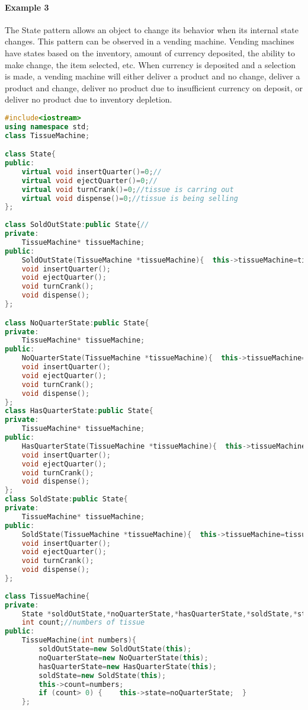 \documentclass{book}
\begin{document}
\paragraph{Example 3}\mbox{}
The State pattern allows an object to change its behavior when its internal state changes.
This pattern can be observed in a vending machine.
Vending machines have states based on the inventory, amount of currency deposited, the ability to make change, the item selected, etc.
When currency is deposited and a selection is made, a vending machine will either deliver a product and no change,
deliver a product and change, deliver no product due to insufficient currency on deposit, or deliver no product due to inventory depletion. 
\begin{lstlisting}[caption={State Pattern exmaple 3: vending (tissue only) meachine}, language=C++]
#include<iostream>  
using namespace std;  
class TissueMachine;

class State{  
public:  
    virtual void insertQuarter()=0;//  
    virtual void ejectQuarter()=0;//
    virtual void turnCrank()=0;//tissue is carring out
    virtual void dispense()=0;//tissue is being selling  
};  
  
class SoldOutState:public State{//  
private:  
    TissueMachine* tissueMachine;  
public:  
    SoldOutState(TissueMachine *tissueMachine){  this->tissueMachine=tissueMachine;  }  
    void insertQuarter();  
    void ejectQuarter();  
    void turnCrank();  
    void dispense();  
};  

class NoQuarterState:public State{
private:  
    TissueMachine* tissueMachine;  
public:  
    NoQuarterState(TissueMachine *tissueMachine){  this->tissueMachine=tissueMachine;  }  
    void insertQuarter();  
    void ejectQuarter();  
    void turnCrank();  
    void dispense();  
};  
class HasQuarterState:public State{
private:  
    TissueMachine* tissueMachine;  
public:  
    HasQuarterState(TissueMachine *tissueMachine){  this->tissueMachine=tissueMachine;  }  
    void insertQuarter();  
    void ejectQuarter();  
    void turnCrank();  
    void dispense();  
};  
class SoldState:public State{
private:  
    TissueMachine* tissueMachine;  
public:  
    SoldState(TissueMachine *tissueMachine){  this->tissueMachine=tissueMachine;  }  
    void insertQuarter();  
    void ejectQuarter();  
    void turnCrank();  
    void dispense();  
};  
  
class TissueMachine{  
private:  
    State *soldOutState,*noQuarterState,*hasQuarterState,*soldState,*state;  
    int count;//numbers of tissue  
public:  
    TissueMachine(int numbers){
        soldOutState=new SoldOutState(this);  
        noQuarterState=new NoQuarterState(this);  
        hasQuarterState=new HasQuarterState(this);  
        soldState=new SoldState(this);  
        this->count=numbers;  
        if (count> 0) {    this->state=noQuarterState;  }  
    };  


\end{lstlisting}
\end{document}
